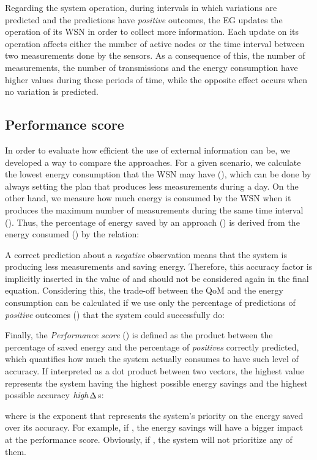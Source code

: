 \documentclass{llncs}
\newcommand{\EG}[1]{EG}
\newcommand{\ourDelta}[2][]{\ensuremath{\Delta\textsuperscript{\text{#1}}
\textsubscript{\text{#2}}}}
\newcommand{\high}[1][ ]{\ensuremath{\text{\emph{high}}#1}}
\newcommand{\highDelta}[2][]{\high{\ourDelta[#1]{#2}}}
\begin{document}
Regarding the system operation, during intervals in which 
variations are predicted and the predictions have \emph{positive} outcomes, 
the \EG{} updates the operation of its WSN in order to collect more 
information. 
Each update on its operation affects either the number of active nodes or the 
time interval between two measurements done by the sensors. As a consequence of 
this, the number of measurements, the number of transmissions and the energy 
consumption have higher values during these periods of time, while the opposite 
effect occurs when no variation is predicted.

\subsection{Performance score}
\label{sec:performance}

In order to evaluate how efficient the use of external information can be, we 
developed a way to compare the approaches. For a given scenario, we calculate 
the lowest energy consumption that the WSN may have (), which 
can be done by always setting the plan that produces less measurements during a 
day. On the other hand, we measure how much energy is consumed by the WSN when 
it produces the maximum number of measurements during the same time interval 
(). Thus, the percentage of energy saved by an approach 
() is derived from the energy consumed () by 
the 
relation:



A correct prediction about a \emph{negative} observation means that the 
system is producing less measurements and saving energy. Therefore, this 
accuracy factor is implicitly inserted in the value of  and should 
not be considered again in the final equation. Considering this, the trade-off 
between the QoM and the energy consumption can be calculated if we use only the 
percentage of predictions of \emph{positive} outcomes () 
that the system could successfully do:



Finally, the \emph{Performance score} () is defined as the product 
between the percentage of saved energy and the percentage of \emph{positives} 
correctly predicted, which quantifies how much the system actually 
consumes to have such level of accuracy. If interpreted as a dot product 
between two vectors, the highest value represents the system having the highest 
possible energy savings and the highest possible accuracy \highDelta{}s:


where  is the exponent that represents the system's 
priority on the energy saved over its accuracy. For example, if , 
the energy savings will have a bigger impact at the performance score. 
Obviously, if , the system will not prioritize any of them. 
\end{document}
